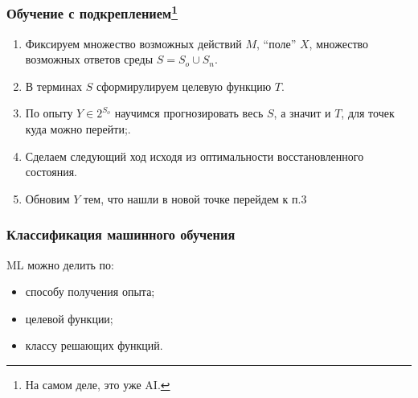 \documentclass[14pt, fleqn, xcolor={dvipsnames, table}]{beamer}
\begin{document}
\begin{frame}
\frametitle{Обучение с подкреплением\footnote{На самом деле, это уже AI.}}
\begin{enumerate}
	\item Фиксируем множество возможных действий $M$, ``поле'' $X$, множество возможных ответов среды $S = S_o \cup S_n$.
	\item В терминах $S$ сформирулируем целевую функцию $T$.
	\item По опыту $Y \in 2^{S_o}$ научимся прогнозировать весь $S$, а значит и $T$, для точек куда можно перейти;.
	\item Сделаем следующий ход исходя из оптимальности восстановленного состояния.
	\item Обновим $Y$ тем, что нашли в новой точке перейдем к п.3
\end{enumerate}
\end{frame}

\begin{frame}
\frametitle{Классификация машинного обучения}
ML можно делить по:
\begin{itemize}
	\item способу получения опыта;
	\item { целевой функции;}
	\item классу решающих функций.
\end{itemize}
\end{frame}
\end{document}
